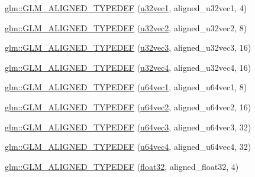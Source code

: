 \begin{DoxyCompactItemize}
\item 
\hyperlink{group__gtx__type__aligned_gac6b161a04d2f8408fe1c9d857e8daac0}{glm\+::\+G\+L\+M\+\_\+\+A\+L\+I\+G\+N\+E\+D\+\_\+\+T\+Y\+P\+E\+D\+EF} (\hyperlink{group__gtc__type__precision_ga99f64714ce341e34036bd10c8b36823a}{u32vec1}, aligned\+\_\+u32vec1, 4)
\item 
\hyperlink{group__gtx__type__aligned_ga1fa0dfc8feb0fa17dab2acd43e05342b}{glm\+::\+G\+L\+M\+\_\+\+A\+L\+I\+G\+N\+E\+D\+\_\+\+T\+Y\+P\+E\+D\+EF} (\hyperlink{group__gtc__type__precision_gad854a1005ce84d8f6e8f05e42893f5c9}{u32vec2}, aligned\+\_\+u32vec2, 8)
\item 
\hyperlink{group__gtx__type__aligned_ga0019500abbfa9c66eff61ca75eaaed94}{glm\+::\+G\+L\+M\+\_\+\+A\+L\+I\+G\+N\+E\+D\+\_\+\+T\+Y\+P\+E\+D\+EF} (\hyperlink{group__gtc__type__precision_ga342e504c37b635393e6747b85147151f}{u32vec3}, aligned\+\_\+u32vec3, 16)
\item 
\hyperlink{group__gtx__type__aligned_ga14fd29d01dae7b08a04e9facbcc18824}{glm\+::\+G\+L\+M\+\_\+\+A\+L\+I\+G\+N\+E\+D\+\_\+\+T\+Y\+P\+E\+D\+EF} (\hyperlink{group__gtc__type__precision_gad3f72b91c5b7efbc377625c44433824d}{u32vec4}, aligned\+\_\+u32vec4, 16)
\item 
\hyperlink{group__gtx__type__aligned_gab253845f534a67136f9619843cade903}{glm\+::\+G\+L\+M\+\_\+\+A\+L\+I\+G\+N\+E\+D\+\_\+\+T\+Y\+P\+E\+D\+EF} (\hyperlink{group__gtc__type__precision_gaf01aa7972f78cabc61558a0171d78a01}{u64vec1}, aligned\+\_\+u64vec1, 8)
\item 
\hyperlink{group__gtx__type__aligned_ga929427a7627940cdf3304f9c050b677d}{glm\+::\+G\+L\+M\+\_\+\+A\+L\+I\+G\+N\+E\+D\+\_\+\+T\+Y\+P\+E\+D\+EF} (\hyperlink{group__gtc__type__precision_ga989179a9ae798526e8bac59fb21678b7}{u64vec2}, aligned\+\_\+u64vec2, 16)
\item 
\hyperlink{group__gtx__type__aligned_gae373b6c04fdf9879f33d63e6949c037e}{glm\+::\+G\+L\+M\+\_\+\+A\+L\+I\+G\+N\+E\+D\+\_\+\+T\+Y\+P\+E\+D\+EF} (\hyperlink{group__gtc__type__precision_ga2d3e22f2413f79536d5cf3561949cd53}{u64vec3}, aligned\+\_\+u64vec3, 32)
\item 
\hyperlink{group__gtx__type__aligned_ga53a8a03dca2015baec4584f45b8e9cdc}{glm\+::\+G\+L\+M\+\_\+\+A\+L\+I\+G\+N\+E\+D\+\_\+\+T\+Y\+P\+E\+D\+EF} (\hyperlink{group__gtc__type__precision_ga70396c4f422824503c870db50b3059fd}{u64vec4}, aligned\+\_\+u64vec4, 32)
\item 
\hyperlink{group__gtx__type__aligned_gab3301bae94ef5bf59fbdd9a24e7d2a01}{glm\+::\+G\+L\+M\+\_\+\+A\+L\+I\+G\+N\+E\+D\+\_\+\+T\+Y\+P\+E\+D\+EF} (\hyperlink{group__gtc__type__precision_ga814f2f65354b6588b067cc5c67a6b340}{float32}, aligned\+\_\+float32, 4)

\end{DoxyCompactItemize}
